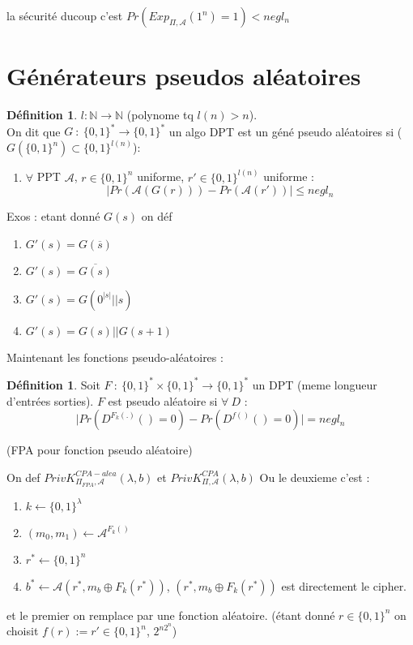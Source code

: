 \documentclass[12pt]{article}
\theoremstyle{plain}
\theoremstyle{definition}
\newtheorem{defn}[subsubsection]{D\'efinition}
\theoremstyle{remark}
\newcommand{\A}{\mathcal{A}}
\newcommand{\N}{\mathbb{N}}
\begin{document}
la sécurité ducoup c'est $Pr(Exp_{\Pi,\A}(1^n)=1)<negl_n$

\section{Générateurs pseudos aléatoires}
\begin{defn}
    $l:\N\rightarrow\N$ (polynome tq $l(n)>n$).\\ On dit que $G~:~\{0,1\}^*\rightarrow\{0,1\}^*$
    un algo DPT est un géné pseudo aléatoires si ($G(\{0,1\}^n)\subset \{0,1\}^{l(n)}$):
    \begin{enumerate}
        \item $\forall$ PPT $\A$, $r\in\{0,1\}^n$ uniforme, $r'\in\{0,1\}^{l(n)}$ uniforme :
        $$\lvert Pr(\A(G(r)))- Pr(\A(r'))\rvert\leq negl_n$$
    \end{enumerate}
\end{defn}

Exos : etant donné $G(s)$ on déf 
\begin{enumerate}
    \item $G'(s)=G(\overline{s})$
    \item $G'(s)=\overline{G(s)}$
    \item $G'(s)=G(0^{\lvert s\rvert}||s)$
    \item $G'(s)=G(s)||G(s+1)$
\end{enumerate}

Maintenant les fonctions pseudo-aléatoires :
\begin{defn}
    Soit $F~:~\{0,1\}^*\times\{0,1\}^*\rightarrow\{0,1\}^*$ un DPT (meme longueur d'entrées sorties). $F$ est
    pseudo aléatoire si $\forall~D$ : $$\lvert Pr\left(D^{F_k(.)}()=0\right)-Pr\left(D^{f()}()=0\right)\rvert=negl_n$$
\end{defn}
(FPA pour fonction pseudo aléatoire)

On def $PrivK_{\Pi_{FPA},\A}^{CPA-alea}(\lambda, b)$ et $PrivK_{\Pi,\A}^{CPA}(\lambda, b)$ Ou le deuxieme c'est :
\begin{enumerate}
    \item $k\leftarrow\{0,1\}^{\lambda}$
    \item $(m_0, m_1)\leftarrow \A^{F_k()}$
    \item $r^*\leftarrow \{0,1\}^n$
    \item $b^*\leftarrow\A(r^*,m_b\oplus F_k(r^*))$, $(r^*,m_b\oplus F_k(r^*))$ est directement le cipher.
\end{enumerate}
et le premier on remplace par une fonction aléatoire. (étant donné $r\in\{0,1\}^n$ on choisit $f(r):=r'\in\{0,1\}^n$, $2^{n2^n}$)
\end{document}
